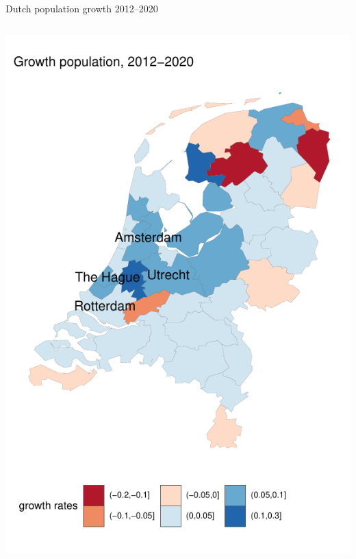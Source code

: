 \documentclass{beamer}
\begin{document}
\begin{frame}{Dutch population growth 2012--2020}
\begin{columns}
\begin{column}{0.5\textwidth}
\begin{center}
			\includegraphics[width=1\textwidth]{../../fig/growth_pop}
		\end{center}
	\end{column}
\end{columns}
\end{frame}
\end{document}
